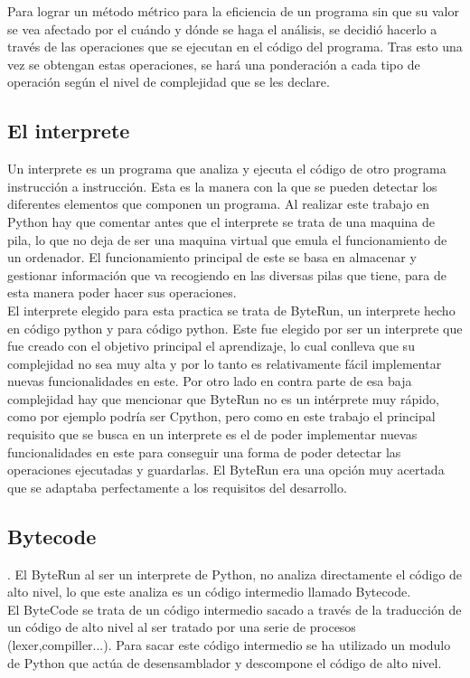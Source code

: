 Para lograr un método métrico para la eficiencia de un programa sin que su valor se vea afectado por el cuándo y dónde se haga el análisis, se decidió hacerlo a través de las operaciones que se ejecutan en el código del programa. Tras esto una vez se obtengan estas operaciones, se hará una ponderación a cada tipo de operación según el nivel de complejidad que se les declare. 

\subsection{El interprete}

Un interprete es un programa que analiza y ejecuta el código de otro programa instrucción a instrucción. Esta es la manera con la que se pueden detectar los diferentes elementos que componen un programa. Al realizar este trabajo en Python hay que comentar antes que el interprete se trata de una maquina de pila, lo que no deja de ser una maquina virtual que emula el funcionamiento de un ordenador. El funcionamiento principal de este se basa en almacenar y gestionar información que va recogiendo en las diversas pilas que tiene, para de esta manera poder hacer sus operaciones.\\

El interprete elegido para esta practica se trata de ByteRun, un interprete hecho en código python y para código python. Este fue elegido por ser un interprete que fue creado con el objetivo principal el aprendizaje, lo cual conlleva que su complejidad no sea muy alta y por lo tanto es relativamente fácil implementar nuevas funcionalidades en este. Por otro lado en contra parte de esa baja complejidad hay que mencionar que ByteRun no es un intérprete muy rápido, como por ejemplo podría ser Cpython, pero como en este trabajo el principal requisito que se busca en un interprete es el de poder implementar nuevas funcionalidades en este para conseguir una forma de poder detectar las operaciones ejecutadas y guardarlas. El ByteRun era una opción muy acertada que se adaptaba perfectamente a los requisitos del desarrollo.


\subsection{Bytecode}.
El ByteRun al ser un interprete de Python, no analiza directamente el código de alto nivel, lo que este analiza es un código intermedio llamado Bytecode.\\ El ByteCode se trata de un código intermedio sacado a través de la traducción de un código de alto nivel al ser tratado por una serie de procesos (lexer,compiller...). Para sacar este código intermedio se ha utilizado un modulo de Python que  actúa de desensamblador y descompone el código de alto nivel. 




